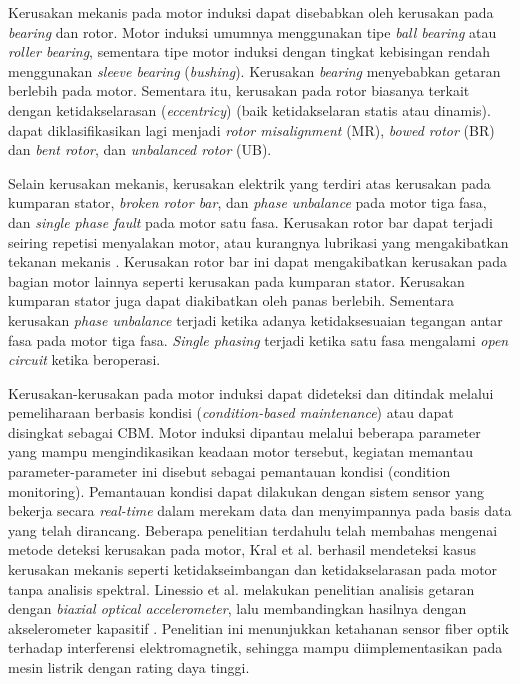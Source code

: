 \documentclass{elsinta}
\begin{document}
Kerusakan mekanis pada motor induksi dapat disebabkan
oleh kerusakan pada \textit{bearing} dan rotor.
Motor induksi umumnya menggunakan tipe \textit{ball bearing} atau
\textit{roller bearing}\cite{Gangsar2020}, sementara tipe motor induksi dengan tingkat kebisingan
rendah menggunakan \textit{sleeve bearing} (\textit{bushing}). 
Kerusakan \textit{bearing} menyebabkan getaran berlebih
pada motor\cite{Gangsar2020}. Sementara itu, kerusakan
pada rotor biasanya terkait dengan ketidakselarasan (\textit{eccentricy}) (baik
ketidakselaran statis atau dinamis)\cite{Gangsar2020,Antonino-Daviu2007}.
dapat diklasifikasikan lagi menjadi \textit{rotor misalignment} (MR),
\textit{bowed rotor} (BR) dan \textit{bent rotor}, dan \textit{unbalanced rotor} (UB).

Selain kerusakan mekanis, kerusakan elektrik yang terdiri
atas kerusakan pada kumparan stator, \textit{broken rotor bar},
dan \textit{phase unbalance} pada motor tiga fasa, dan
\textit{single phase fault} pada motor satu fasa.
Kerusakan rotor bar dapat terjadi seiring repetisi menyalakan
motor, atau kurangnya lubrikasi yang mengakibatkan tekanan mekanis
\cite{Gangsar2020, Fier2001}.
Kerusakan rotor bar ini dapat mengakibatkan kerusakan pada bagian
motor lainnya seperti kerusakan pada kumparan stator. Kerusakan
kumparan stator juga dapat diakibatkan oleh panas berlebih\cite{Gangsar2020}.
Sementara kerusakan \textit{phase unbalance} terjadi ketika adanya
ketidaksesuaian tegangan antar fasa pada motor tiga fasa. \textit{Single phasing}
terjadi ketika satu fasa mengalami \textit{open circuit} ketika beroperasi.

Kerusakan-kerusakan pada motor induksi dapat dideteksi dan ditindak melalui
pemeliharaan berbasis kondisi (\textit{condition-based maintenance}) atau dapat disingkat sebagai CBM. Motor induksi
dipantau melalui beberapa parameter yang mampu mengindikasikan keadaan motor tersebut, kegiatan
memantau parameter-parameter ini disebut sebagai pemantauan kondisi (condition monitoring).
Pemantauan kondisi dapat dilakukan dengan sistem sensor yang bekerja secara \textit{real-time}
dalam merekam data dan menyimpannya pada basis data yang telah dirancang.
Beberapa penelitian terdahulu telah membahas mengenai metode
deteksi kerusakan pada motor, Kral et al. berhasil mendeteksi kasus kerusakan mekanis
seperti ketidakseimbangan dan ketidakselarasan pada motor tanpa analisis spektral\cite{Kral2004}.
Linessio et al. melakukan penelitian analisis getaran dengan \textit{biaxial optical accelerometer},
lalu membandingkan hasilnya dengan akselerometer kapasitif \cite{Linessio2016}.
Penelitian ini menunjukkan ketahanan sensor fiber optik terhadap
interferensi elektromagnetik, sehingga mampu diimplementasikan pada mesin listrik dengan rating daya tinggi\cite{Linessio2016}.
\end{document}
